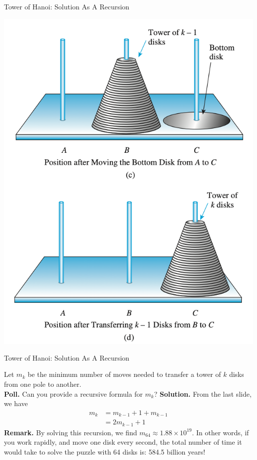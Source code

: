 \documentclass[10pt]{beamer}
\begin{document}
\begin{frame}{Tower of Hanoi: Solution As A Recursion}
\begin{minipage}{0.48\textwidth}
     \includegraphics[width=\textwidth]{images/tower_of_hanoi_solution_2}
    \end{minipage}
\end{frame}
	
\begin{frame}{Tower of Hanoi: Solution As A Recursion}

Let $m_k$ be the minimum number of moves needed to transfer a tower of $k$ disks from one pole to another. \\
\vfill 
\colorbox{yellow!30}{\textbf{Poll.}} Can you provide a recursive formula for $m_k$?
\vfill \pause 
\colorbox{green!30}{\textbf{Solution.}} 
From the last slide, we have
%
\begin{align*}
m_k &= m_{k-1} + 1 + m_{k-1} \\
	&= 2 m_{k-1} + 1
\end{align*}
\vfill 
\colorbox{red!30}{\textbf{Remark.}} By solving this recursion, we find  $m_{64} \approx 1.88 \times 10^{19}$.  In other words, if you work rapidly, and move one disk every second, the total number of time it would take to solve the puzzle with 64 disks is: \alert{584.5 billion years}! 
\end{frame}
\end{document}

